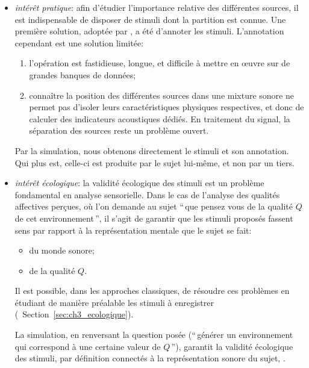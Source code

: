 \begin{itemize}
\item \emph{intérêt pratique}: afin d'étudier l'importance relative des différentes sources, il est indispensable de disposer de stimuli dont la partition est connue. Une première solution, adoptée par \citep{lavandier2006contribution}, a été d'annoter les stimuli. L'annotation cependant est une solution limitée: 
\begin{enumerate}
\item l'opération est fastidieuse, longue, et difficile à mettre en œuvre sur de grandes banques de données;
\item connaître la position des différentes sources dans une mixture sonore ne permet pas d'isoler leurs caractéristiques physiques respectives, et donc de calculer des indicateurs acoustiques dédiés. En traitement du signal, la séparation des sources reste un problème ouvert.
\end{enumerate}

Par la simulation, nous obtenons directement le stimuli et son annotation. Qui plus est, celle-ci est produite par le sujet lui-même, et non par un tiers. 

\item \emph{intérêt écologique}: la validité écologique des stimuli est un problème fondamental en analyse sensorielle. Dans le cas de l'analyse des qualités affectives perçues, où l'on demande au sujet ``\,que pensez vous de la qualité $Q$ de cet environnement\,'', il s'agit de garantir que les stimuli proposés fassent sens par rapport à la représentation mentale que le sujet se fait: 

\begin{itemize}
\item  du monde sonore; 
\item  de la qualité $Q$. 
\end{itemize}

Il est possible, dans les approches classiques, de résoudre ces problèmes en étudiant de manière préalable les stimuli à enregistrer (\cf~Section~\ref{sec:ch3_ecologique}). 

La simulation, en renversant la question posée (``\,générer un environnement qui correspond à une certaine valeur de $Q$\,''), garantit la validité écologique des stimuli, par définition connectés à la représentation sonore du sujet, .


\end{itemize}
